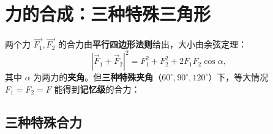 \chapter{力的合成：三种特殊三角形}

两个力 $\vec{F_1}, \vec{F_2}$ 的合力由\textbf{平行四边形法则}给出，大小由余弦定理：
\[
|\vec F_1 + \vec F_2|^2 = F_1^2 + F_2^2 + 2 F_1 F_2 \cos \alpha,
\]
其中 $\alpha$ 为两力的\textbf{夹角}。但\textbf{三种特殊夹角}（$60^\circ, 90^\circ, 120^\circ$）下，等大情况 $F_1 = F_2 = F$ 能得到\textbf{记忆级}的合力：

\section{三种特殊合力}


